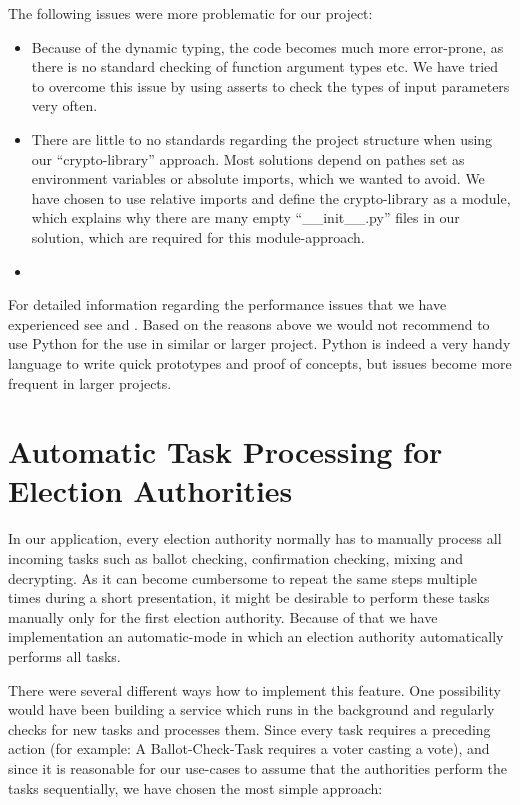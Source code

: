 The following issues were more problematic for our project:
\begin{itemize}
  \item Because of the dynamic typing, the code becomes much more error-prone, as there is no standard checking of function argument types etc. We have tried to overcome this issue by using asserts to check the types of input parameters very often.
	\item There are little to no standards regarding the project structure when using our "`crypto-library"' approach. Most solutions depend on pathes set as environment variables or absolute imports, which we wanted to avoid. We have chosen to use relative imports and define the crypto-library as a module, which explains why there are many empty "`\_\_init\_\_.py"' files in our solution, which are required for this module-approach.
	\item 
\end{itemize}

For detailed information regarding the performance issues that we have experienced see \cite{slowpy} and \cite{slowpy2}. Based on the reasons above we would not recommend to use Python for the use in similar or larger project. Python is indeed a very handy language to write quick prototypes and proof of concepts, but issues become more frequent in larger projects.

\section{Automatic Task Processing for Election Authorities}
In our application, every election authority normally has to manually process all incoming tasks such as ballot checking, confirmation checking, mixing and decrypting. As it can become cumbersome to repeat the same steps multiple times during a short presentation, it might be desirable to perform these tasks manually only for the first election authority. Because of that we have implementation an automatic-mode in which an election authority automatically performs all tasks. 

There were several different ways how to implement this feature. One possibility would have been building a service which runs in the background and regularly checks for new tasks and processes them. Since every task requires a preceding action (for example: A Ballot-Check-Task requires a voter casting a vote), and since it is reasonable for our use-cases to assume that the authorities perform the tasks sequentially, we have chosen the most simple approach:

